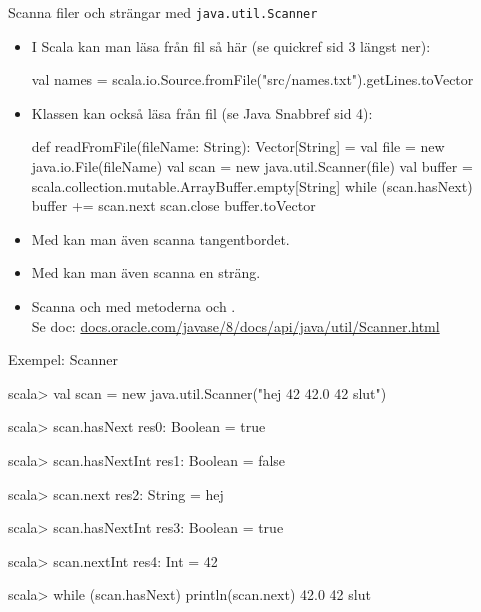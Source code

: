 \begin{Slide}{Scanna filer och strängar med \texttt{java.util.Scanner}}\SlideFontTiny
\setlength{\leftmargini}{0pt}
\begin{itemize}
\item I Scala kan man läsa från fil så här (se quickref sid 3 längst ner):

\begin{Code}
val names = scala.io.Source.fromFile("src/names.txt").getLines.toVector
\end{Code}

\item Klassen  kan också läsa från fil (se Java Snabbref sid 4):


\begin{Code}
def readFromFile(fileName: String): Vector[String] = {
  val file = new java.io.File(fileName)
  val scan = new java.util.Scanner(file)
  val buffer = scala.collection.mutable.ArrayBuffer.empty[String]
  while (scan.hasNext) {
    buffer += scan.next
  }
  scan.close
  buffer.toVector
}
\end{Code}

\item Med  kan man även scanna tangentbordet.

\item Med  kan man även scanna en sträng.

\item Scanna  och  med metoderna  och .\\Se doc: \href{https://docs.oracle.com/javase/8/docs/api/java/util/Scanner.html}{\SlideFontTiny docs.oracle.com/javase/8/docs/api/java/util/Scanner.html}
\end{itemize}
\end{Slide}


\begin{Slide}{Exempel: Scanner}
\begin{REPL}
scala> val scan = new java.util.Scanner("hej 42 42.0   42 slut")

scala> scan.hasNext
res0: Boolean = true

scala> scan.hasNextInt
res1: Boolean = false

scala> scan.next
res2: String = hej

scala> scan.hasNextInt
res3: Boolean = true

scala> scan.nextInt
res4: Int = 42

scala> while (scan.hasNext) println(scan.next)
42.0
42
slut
\end{REPL}
\end{Slide}



